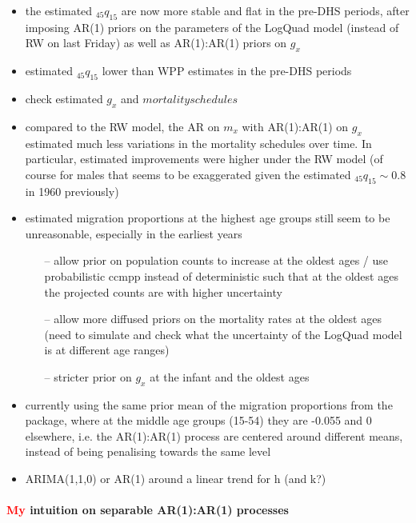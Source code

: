 \documentclass[12pt,a4paper]{article}
\date{\vspace{-5ex}}
\begin{document}
\begin{itemize}

\end{itemize}
\begin{itemize}
\item the estimated $_{45}q_{15}$ are now more stable and flat in the pre-DHS periods, after imposing AR(1) priors on the parameters of the LogQuad model (instead of RW on last Friday) as well as AR(1):AR(1) priors on $g_x$
\item estimated $_{45}q_{15}$ lower than WPP estimates in the pre-DHS periods
\item check estimated $g_x$ and $mortality schedules$
\item compared to the RW model, the AR on $m_x$ with AR(1):AR(1) on $g_x$ estimated much less variations in the mortality schedules over time. In particular, estimated improvements were higher under the RW model (of course for males that seems to be exaggerated given the estimated $_{45}q_{15} \sim 0.8$ in 1960 previously)
\item estimated migration proportions at the highest age groups still seem to be unreasonable, especially in the earliest years
	\begin{itemize}
  \item[--] allow prior on population counts to increase at the oldest ages / use probabilistic ccmpp instead of deterministic such that at the oldest ages the projected counts are with higher uncertainty
	\item[--] allow more diffused priors on the mortality rates at the oldest ages (need to simulate and check what the uncertainty of the LogQuad model is at different age ranges)
	\item[--] stricter prior on $g_x$ at the infant and the oldest ages
	\end{itemize}
\item currently using the same prior mean of the migration proportions from the package, where at the middle age groups (15-54) they are -0.055 and 0 elsewhere, i.e. the AR(1):AR(1) process are centered around different means, instead of being penalising towards the same level
\item ARIMA(1,1,0) or AR(1) around a linear trend for h (and k?)
\end{itemize}

\paragraph{\textcolor{red}{My} intuition on separable AR(1):AR(1) processes} \\~\\
\end{document}
